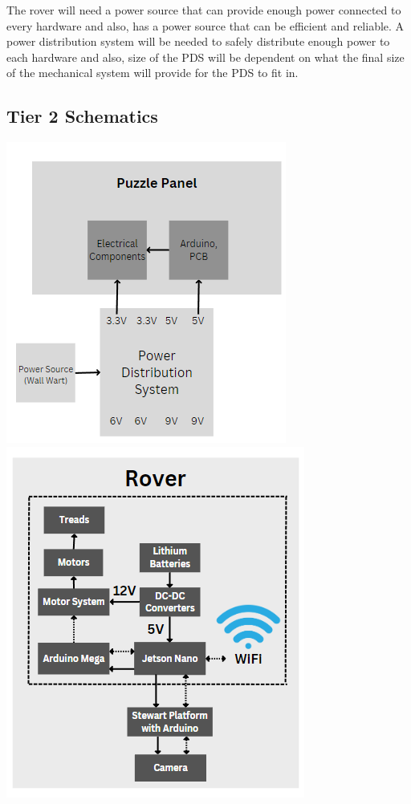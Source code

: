 \documentclass[a4paper, 10pt]{article}
\begin{document}
	The rover will need a power source that can provide enough power connected to every hardware and also, has a power source that can be efficient and reliable. A power distribution system will be needed to safely distribute enough power to each hardware and also, size of the PDS will be dependent on what the final size of the mechanical system will provide for the PDS to fit in.  

	\subsection{Tier 2 Schematics}
\includegraphics[scale=0.8]{Puzzle panel simplified}
\includegraphics[scale=0.8]{Rover schematic simplified}
\end{document}
